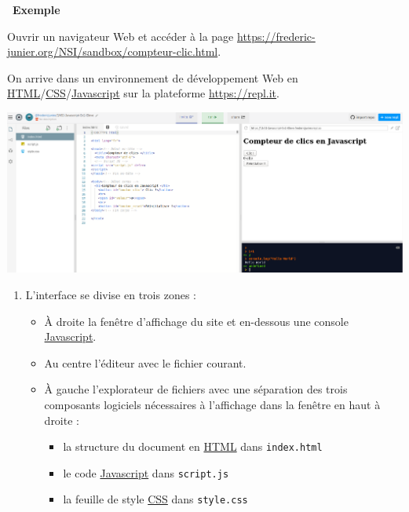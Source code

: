 \documentclass[
  11pt,
]{article}
\newcommand{\passthrough}[1]{#1}
\providecommand{\tightlist}{%
  \setlength{\itemsep}{0pt}\setlength{\parskip}{0pt}}
\newcounter{exo}
\newcounter{def}
\newcounter{exple}
\newenvironment{exemple}[1]
{\par \medskip   \addtocounter{exple}{1} \noindent  
\begin{bclogo}[arrondi =0.1,   noborder = true, logo=\bclampe, marge=4]{~\textbf{Exemple} \textbf{\theexple} {\itshape #1} }  \par}
{
\end{bclogo}
 \par \bigskip }
\newcounter{logi}
\begin{document}
\begin{exemple}{}

Ouvrir un navigateur Web et accéder à la page
\url{https://frederic-junier.org/NSI/sandbox/compteur-clic.html}.

On arrive dans un environnement de développement Web en
\href{https://developer.mozilla.org/fr/docs/Glossaire/HTML}{HTML}/\href{https://developer.mozilla.org/fr/docs/Glossaire/CSS}{CSS}/\href{https://developer.mozilla.org/fr/docs/Glossaire/JavaScript}{Javascript}
sur la plateforme \url{https://repl.it}.

\includegraphics{images/exo4-fig1.png}\\

\begin{enumerate}
\def\labelenumi{\arabic{enumi}.}
\item
  L'interface se divise en trois zones :

  \begin{itemize}
  \item
    À droite la fenêtre d'affichage du site et en-dessous une console
    \href{https://developer.mozilla.org/fr/docs/Glossaire/JavaScript}{Javascript}.
  \item
    Au centre l'éditeur avec le fichier courant.
  \item
    À gauche l'explorateur de fichiers avec une séparation des trois
    composants logiciels nécessaires à l'affichage dans la fenêtre en
    haut à droite :

    \begin{itemize}
    \tightlist
    \item
      la structure du document en
      \href{https://developer.mozilla.org/fr/docs/Glossaire/HTML}{HTML}
      dans \passthrough{\lstinline!index.html!}
    \item
      le code
      \href{https://developer.mozilla.org/fr/docs/Glossaire/JavaScript}{Javascript}
      dans \passthrough{\lstinline!script.js!}
    \item
      la feuille de style
      \href{https://developer.mozilla.org/fr/docs/Glossaire/CSS}{CSS}
      dans \passthrough{\lstinline!style.css!}
    \end{itemize}


\end{itemize}
\end{enumerate}
\end{exemple}
\end{document}
